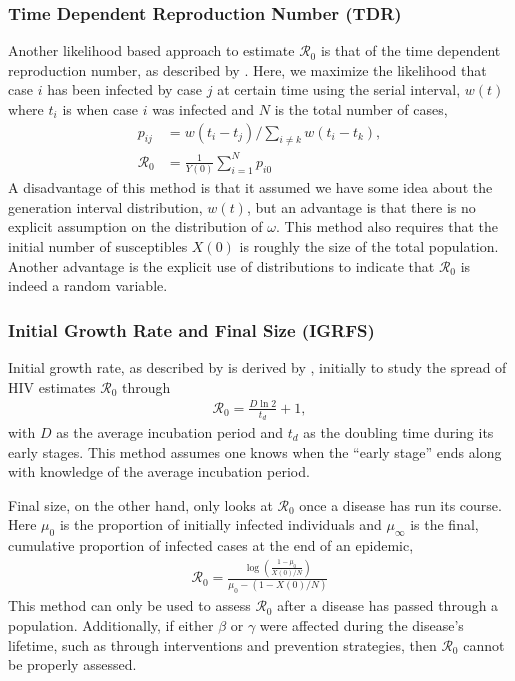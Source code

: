 \documentclass[12pt]{article}
\newcommand{\rr}{\ensuremath{\mathcal{R}_0}}
\begin{document}
\subsubsection{Time Dependent Reproduction Number (TDR)}\label{sec:timedep}
Another likelihood based approach to estimate $\rr$ is that of the time dependent reproduction number, as described by \cite{forsberg2008}.  Here, we maximize the likelihood that case $i$ has been infected by case $j$ at certain time using the serial interval, $w(t)$ where $t_i$ is when case $i$ was infected and $N$ is the total number of cases,
\begin{align*}
  p_{ij} &= w(t_i- t_j) / \sum_{i \neq k} w(t_i - t_k),\\
  \rr &= \frac{1}{Y(0)}\sum_{i=1}^N p_{i0}
  \end{align*}
  A disadvantage of this method is that it assumed we have some idea about the generation interval distribution, $w(t)$, but an advantage is that there is no explicit assumption on the distribution of $\omega$.  This method also requires that the initial number of susceptibles $X(0)$ is roughly the size of the total population.  Another advantage is the explicit use of distributions to indicate that $\rr$ is indeed a random variable.

\subsubsection{Initial Growth Rate and Final Size (IGRFS)}
\label{sec:igr-fs}

Initial growth rate, as described by \cite{dietz1993estimation} is derived by \cite{anderson1986}, initially to study the spread of HIV estimates $\rr$ through
\begin{align*}
\rr = \frac{D \ln 2} {t_d} + 1,
  \end{align*}
  with $D$ as the average incubation period and $t_d$ as the doubling time during its early stages.  This method assumes one knows when the ``early stage'' ends along with knowledge of the average incubation period.  

  Final size, on the other hand, only looks at $\rr$ once a disease has run its course.  Here $\mu_0$ is the proportion of initially infected individuals and $\mu_\infty$ is the final, cumulative proportion of infected cases at the end of an epidemic,
\begin{align}\label{r0_attackrate}
\rr =  \frac{\log \left (\frac{1  - \mu_0}{X(0)/N}  \right ) }{\mu_0 - (1 - X(0)/N)}
\end{align}
This method can only be used to assess $\rr$ after a disease has passed through a population.  Additionally, if either $\beta$ or $\gamma$ were affected during the disease's lifetime, such as through interventions and prevention strategies, then $\rr$ cannot be properly assessed.
\end{document}
